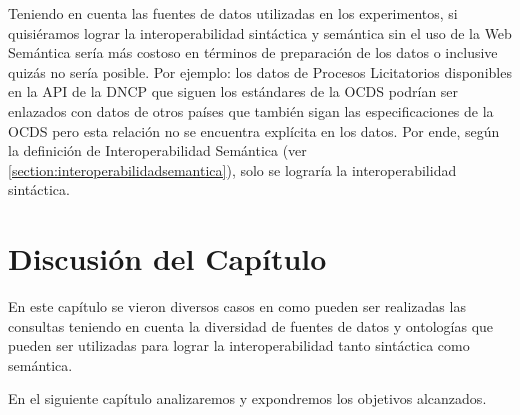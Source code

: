 Teniendo en cuenta las fuentes de datos utilizadas en los experimentos, si quisiéramos lograr la interoperabilidad sintáctica y semántica sin el uso de la Web Semántica sería más costoso en términos de preparación de los datos o inclusive quizás no sería posible. Por ejemplo: los datos de Procesos Licitatorios disponibles en la API de la DNCP que siguen los estándares de la OCDS podrían ser enlazados con datos de otros países que también sigan las especificaciones de la OCDS pero esta relación no se encuentra explícita en los datos. Por ende, según la definición de Interoperabilidad Semántica (ver \ref{section:interoperabilidadsemantica}), solo se lograría la interoperabilidad sintáctica.

\section{Discusión del Capítulo}

En este capítulo se vieron diversos casos en como pueden ser realizadas las consultas teniendo en cuenta la diversidad de fuentes de datos y ontologías que pueden ser utilizadas para lograr la interoperabilidad tanto sintáctica como semántica. 
 
En el siguiente capítulo analizaremos y expondremos los objetivos alcanzados.


